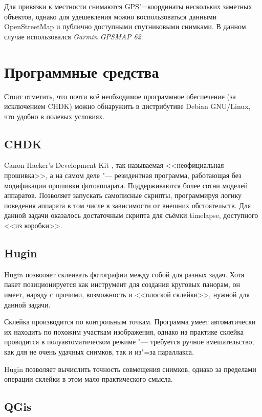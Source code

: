 \documentclass[10pt, a5paper]{article}
\begin{document}
Для привязки к местности снимаются GPS"=координаты нескольких заметных объектов, однако для удешевления можно воспользоваться данными OpenStreetMap и публично доступными спутниковыми снимками. В данном случае использовался \emph{Garmin GPSMAP 62}.

\section*{Программные средства}

Стоит отметить, что почти всё необходимое программное обеспечение (за исключением CHDK) можно обнаружить в дистрибутиве Debian GNU/Linux, что удобно в полевых условиях.

\subsection*{CHDK}

Canon Hacker's Development Kit \cite{samsbib1}, так называемая <<неофициальная прошивка>>, а на самом деле "--- резидентная программа, работающая без модификации прошивки фотоаппарата. Поддерживаются более сотни моделей аппаратов. Позволяет запускать самописные скрипты, программируя логику поведения аппарата в том числе в зависимости от внешних обстоятельств. Для данной задачи оказалось достаточным скрипта для съёмки timelapse, доступного <<из коробки>>.

\subsection*{Hugin}

Hugin \cite{samsbib2} позволяет склеивать фотографии между собой для разных задач. Хотя пакет позиционируется как инструмент для создания круговых панорам, он имеет, наряду с прочими, возможность и <<плоской склейки>>, нужной для данной задачи.

Склейка производится по контрольным точкам. Программа умеет автоматически их находить по похожим участкам изображения, однако на практике склейка проводится в полуавтоматическом режиме "--- требуется ручное вмешательство, как для не очень удачных снимков, так и из"=за параллакса.

Hugin позволяет вычислить точность совмещения снимков, однако за пределами операции склейки в этом мало практического смысла.

\subsection*{QGis}
\end{document}
